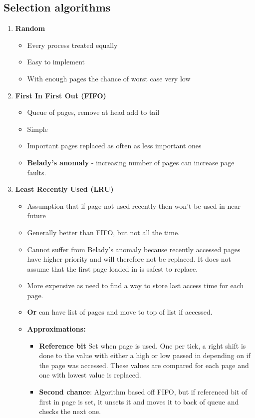 \documentclass{article}
\begin{document}
	\subsection{Selection algorithms}
		\begin{enumerate}
			\item \textbf{Random}
			\begin{itemize}
				\item Every process treated equally
				\item Easy to implement
				\item With enough pages the chance of worst case very low
			\end{itemize}
			
			\item \textbf{First In First Out (FIFO)}
			\begin{itemize}
				\item Queue of pages, remove at head add to tail
				\item Simple
				\item Important pages replaced as often as less important ones
				\item \textbf{Belady's anomaly }- increasing number of pages can increase page faults.
			\end{itemize}
			
			\item \textbf{Least Recently Used (LRU)}
			\begin{itemize}
				\item Assumption that if page not used recently then won't be used in near future
				\item Generally better than FIFO, but not all the time.
				\item Cannot suffer from Belady's anomaly because recently accessed pages have higher priority and will therefore not be replaced. It does not assume that the first page loaded in is safest to replace.
				\item More expensive as need to find a way to store last access time for each page.
				\item \textbf{Or} can have list of pages and move to top of list if accessed.
				\item \textbf{Approximations:}
				\begin{itemize}
					\item \textbf{Reference bit} Set when page is used. One per tick, a right shift is done to the value with either a high or low passed in depending on if the page was accessed. These values are compared for each page and one with lowest value is replaced.
					\item \textbf{Second chance}: Algorithm based off FIFO, but if referenced bit of first in page is set, it unsets it and moves it to back of queue and checks the next one.
				\end{itemize}
			\end{itemize}
			

\end{enumerate}
\end{document}
